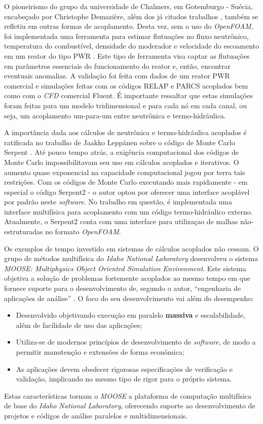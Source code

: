 O pioneirismo do grupo da universidade de Chalmers, em Gotemburgo - Suécia, encabeçado
por Christophe Demazière, além dos já citados trabalhos \cite{Jareteg2012, Jareteg2014},
também se refletiu em outras formas de acoplamento. Desta vez, sem o uso do \textit{OpenFOAM},
foi implementada uma ferramenta para estimar flutuações no fluxo neutrônico, temperatura
do combustível, densidade do moderador e velocidade do escoamento em um reator do tipo PWR
\cite{Larsson2012}. Este tipo de ferramenta visa captar as flutuações em parâmetros
essenciais do funcionamento do reator e, então, encontrar eventuais anomalias. A validação
foi feita com dados de um reator PWR comercial e simulações feitas com os códigos
RELAP e PARCS acoplados bem como com o \textit{CFD} comercial Fluent. É importante ressaltar que
estas simulações foram feitas para um modelo tridimensional e para cada nó em cada canal,
ou seja, um acoplamento um-para-um entre neutrônica e termo-hidráulica.

A importância dada aos cálculos de neutrônica e termo-hidráulica acoplados
é ratificada no trabalho de Jaakko Leppänen sobre o código de Monte Carlo
Serpent \cite{Leppanen2012}. Até pouco tempo atrás, a exigência computacional dos códigos
de Monte Carlo impossibilitavam seu uso em cálculos acoplados e iterativos. O aumento
quase exponencial na capacidade computacional jogou por terra tais restrições.
Com os códigos de Monte Carlo executando mais rapidamente - em especial o código Serpent2 -
o autor optou por oferecer uma interface acoplável por padrão neste \textit{software}.
No trabalho em questão, é implementada uma interface multifísica para acoplamento com um
código termo-hidráulico externo. Atualmente, o Serpent2 conta com uma interface para utilizaçao
de malhas não-estruturadas no formato \textit{OpenFOAM}.

Os exemplos de tempo investido em sistemas de cálculos acoplados não cessam. O grupo
de métodos multifísica do \textit{Idaho National Laboratory} desenvolveu o sistema
\textit{MOOSE: Multiphysics Object Oriented Simulation Environment}. Este sistema objetiva
a solução de problemas fortemente acoplados ao mesmo tempo em que fornece suporte para
o desenvolvimento de, segundo o autor, ``engenharia de aplicações de análise''
\cite{Gaston2009}. O foco do seu desenvolvimento vai além do desempenho:
\begin{itemize}
\item Desenvolvido objetivando execução em paralelo \textbf{massiva} e escalabilidade,
  além de facilidade de uso das aplicações;
\item Utiliza-se de modernos princípios de desenvolvimento de \textit{software}, de modo
  a permitir manutenção e extensões de forma econômica;
\item As aplicações devem obedecer rigorosas especificações de verificação e validação,
  implicando no mesmo tipo de rigor para o próprio sistema.
\end{itemize}
Estas características tornam o \textit{MOOSE} a plataforma de computação multifísica
de base do \textit{Idaho National Laboratory}, oferecendo suporte ao desenvolvimento
de projetos e códigos de análise paralelos e multidimensionais.

